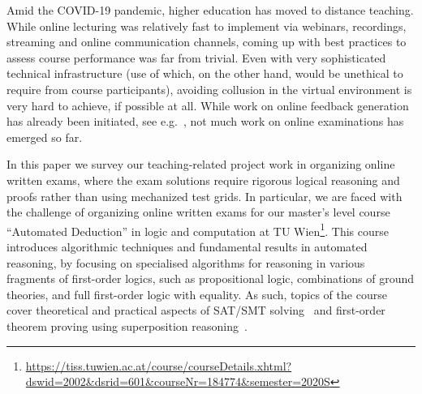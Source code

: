 Amid the COVID-19 pandemic, higher education has moved to distance
teaching. While online lecturing was relatively fast to implement via
webinars, recordings,  streaming and online communication channels,
coming up with best practices to assess course performance was far
from trivial. Even with very sophisticated technical infrastructure
(use of which, on the other hand, would be unethical to require from course
participants), avoiding collusion in the virtual
environment is very hard to achieve, if possible at all.
While work on
online feedback generation has already been initiated, see
e.g.~\cite{Zuleger18,Wang18}, 
not much work on online examinations has emerged so far.

In this paper we survey our teaching-related project work in organizing online
written exams, where the exam solutions require rigorous
logical reasoning and proofs rather than using mechanized test grids.
In particular, we are faced with the challenge of organizing online
written exams for our master's level course ``Automated
Deduction'' in logic and computation at TU
Wien\footnote{\url{https://tiss.tuwien.ac.at/course/courseDetails.xhtml?dswid=2002\&dsrid=601\&courseNr=184774\&semester=2020S}}.
This course introduces algorithmic techniques and fundamental results
in automated reasoning, by focusing on specialised algorithms for
reasoning in various fragments of first-order logics, such as
propositional logic, combinations of ground theories, and full
first-order logic with equality.
As such, topics of the course cover theoretical and practical
aspects of SAT/SMT solving~\cite{DPLL,Tinelli02,DPLLT} and first-order theorem proving using
superposition reasoning~\cite{Rubio01,Vampire13}.


